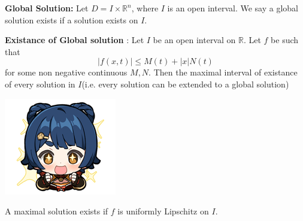 \documentclass{tufte-book}
\begin{document}
\begin{tcolorbox}[colback=red!5!white]
	\textbf{Global Solution: }Let $D=I\times \mathbb R^n$, where $I$ is an open interval. We say a global solution exists if a solution exists on $I$.
\end{tcolorbox}

\begin{tcolorbox}[colback=blue!8!white]
	\textbf{Existance of Global solution }: Let $I$ be an open interval on $\mathbb R$. Let $f$ be such that 
	$$|f(x,t)|\leq M(t)+|x|N(t)$$
	for some non negative continuous $M,N$. Then the maximal interval of existance of every solution in $I$(i.e. every solution can be extended to a global solution)
\end{tcolorbox}
\begin{marginfigure}
	\includegraphics{5.png}
\end{marginfigure}


\begin{tcolorbox}[colback=green!8!white]
	A maximal solution exists if $f$ is uniformly Lipschitz on $I$.
\end{tcolorbox}
\end{document}
